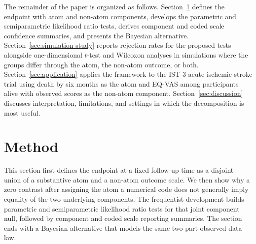 \documentclass[11pt]{article}
\begin{document}
The remainder of the paper is organized as follows. Section~\ref{sec:method} defines the endpoint with atom and non-atom components, develops the parametric and semiparametric likelihood ratio tests, derives component and coded scale confidence summaries, and presents the Bayesian alternative. Section~\ref{sec:simulation-study} reports rejection rates for the proposed tests alongside one-dimensional $t$-test and Wilcoxon analyses in simulations where the groups differ through the atom, the non-atom outcome, or both. Section~\ref{sec:application} applies the framework to the IST-3 acute ischemic stroke trial using death by six months as the atom and EQ-VAS among participants alive with observed scores as the non-atom component. Section~\ref{sec:discussion} discusses interpretation, limitations, and settings in which the decomposition is most useful.



\section{Method}\label{sec:method}

This section first defines the endpoint at a fixed follow-up time as a disjoint union of a substantive atom and a non-atom outcome scale. We then show why a zero contrast after assigning the atom a numerical code does not generally imply equality of the two underlying components. The frequentist development builds parametric and semiparametric likelihood ratio tests for that joint component null, followed by component and coded scale reporting summaries. The section ends with a Bayesian alternative that models the same two-part observed data law.
\end{document}
